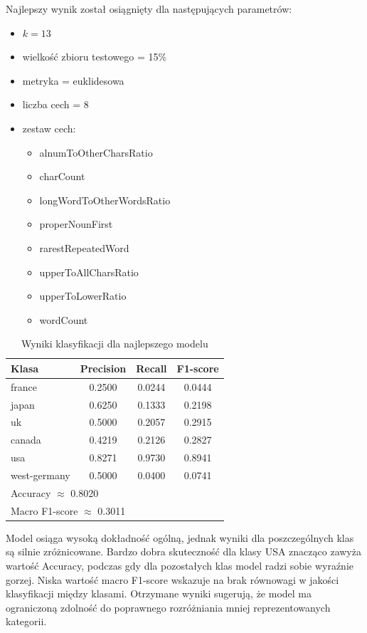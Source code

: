 \documentclass{article}
\begin{document}
\noindent
Najlepszy wynik został osiągnięty dla następujących parametrów:
\begin{itemize}
	\item $k = 13$
	\item wielkość zbioru testowego = 15\%
	\item metryka = euklidesowa
	\item liczba cech = 8
	\item zestaw cech: 
	\begin{itemize}
		\item alnumToOtherCharsRatio
		\item charCount
		\item longWordToOtherWordsRatio
		\item properNounFirst
		\item rarestRepeatedWord
		\item upperToAllCharsRatio
		\item upperToLowerRatio
		\item wordCount
	\end{itemize}
\end{itemize}

\newpage
\begin{table}[H]
	\centering
	\caption{Wyniki klasyfikacji dla najlepszego modelu}
	\label{tab:classification_report}
	\begin{tabular}{lccc}
		\hline
		\textbf{Klasa} & \textbf{Precision} & \textbf{Recall} & \textbf{F1-score} \\
		\hline
		france         & 0.2500 & 0.0244 & 0.0444 \\
		japan          & 0.6250 & 0.1333 & 0.2198 \\
		uk             & 0.5000 & 0.2057 & 0.2915 \\
		canada         & 0.4219 & 0.2126 & 0.2827 \\
		usa            & 0.8271 & 0.9730 & 0.8941 \\
		west-germany   & 0.5000 & 0.0400 & 0.0741 \\
		\hline
		\multicolumn{4}{l}{Accuracy $\approx$ 0.8020} \\
		\multicolumn{4}{l}{Macro F1-score $\approx$ 0.3011} \\
		\hline
	\end{tabular}
\end{table}

\noindent
Model osiąga wysoką dokładność ogólną, jednak wyniki dla poszczególnych klas są silnie zróżnicowane. Bardzo dobra skuteczność dla klasy USA znacząco zawyża wartość Accuracy, podczas gdy dla pozostałych klas model radzi sobie wyraźnie gorzej. Niska wartość macro F1-score wskazuje na brak równowagi w jakości klasyfikacji między klasami. Otrzymane wyniki sugerują, że model ma ograniczoną zdolność do poprawnego rozróżniania mniej reprezentowanych kategorii.
\end{document}
